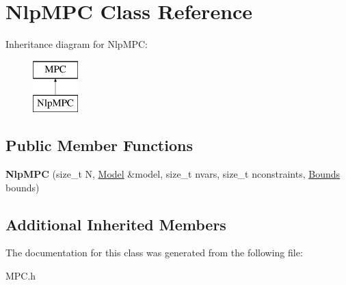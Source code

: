 \hypertarget{classNlpMPC}{}\section{Nlp\+M\+PC Class Reference}
\label{classNlpMPC}
Inheritance diagram for Nlp\+M\+PC\+:\begin{figure}[H]
\begin{center}
\leavevmode
\includegraphics[height=2.000000cm]{classNlpMPC}
\end{center}
\end{figure}
\subsection*{Public Member Functions}
\begin{DoxyCompactItemize}
\item 
\mbox{\label{classNlpMPC_aefa83835f088de730015f846761428e5}} 
{\bfseries Nlp\+M\+PC} (size\+\_\+t N, \mbox{\hyperlink{classModel}{Model}} \&model, size\+\_\+t nvars, size\+\_\+t nconstraints, \mbox{\hyperlink{structBounds}{Bounds}} bounds)
\end{DoxyCompactItemize}
\subsection*{Additional Inherited Members}


The documentation for this class was generated from the following file\+:\begin{DoxyCompactItemize}
\item 
M\+P\+C.\+h\end{DoxyCompactItemize}
